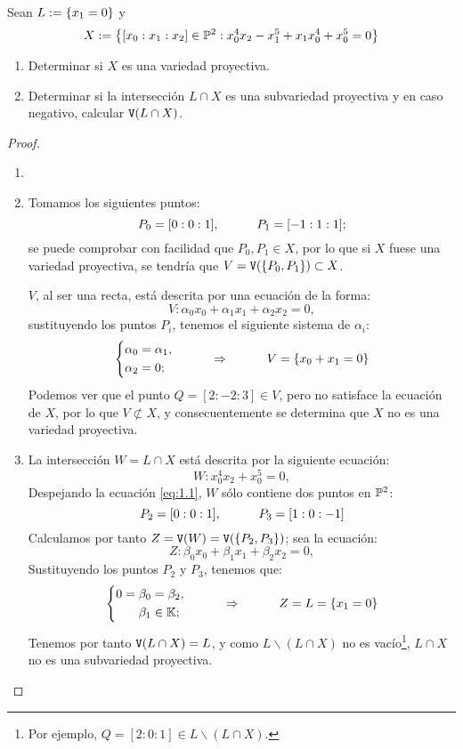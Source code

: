 \documentclass{homeworg}
\author{\hspace{\halte}\hspace{-4.02em}\normalsize Benaroya~Garzas, Isidro\\
\hspace{\halte}\normalsize Carpes~Martínez, Antonio~Alberto\\
\hspace{\halte}\hspace{-2.74em}\normalsize Muela~Cascallana, Juan~José\\
\hspace{\halte}\hspace{-5.35em}\normalsize Salamanca~Camacho, Jaime\\
\hspace{\halte}\hspace{1.68em}\normalsize Wu, Xiaoye}}
\begin{document}
\renewcommand{\proofname}{Solución}

\maketitle

\normalsize
\exercise
Sean $L:=\qty{x_{1}=0}$ y $$X:=\qty{\qty[x_{0}:x_{1}:x_{2}]\in\P^{2}:x_{0}^{4}x_{2}-x_{1}^{5}+x_{1}x_{0}^{4}+x_{0}^{5}=0}$$
\begin{enumerate}[label=\roman*)]
\item Determinar si $X$ es una variedad proyectiva.
\item Determinar si la intersección $L\cap X$ es una subvariedad proyectiva y en caso negativo, calcular $\V\qty(L\cap X)$.
\end{enumerate}

\begin{proof}
\begin{enumerate}[label=\roman*)]
\item[]
\item Tomamos los siguientes puntos:
$$P_{0}=\qty[0:0:1],\hmid P_{1}=\qty[-1:1:1];$$
se puede comprobar con facilidad que $P_{0},P_{1}\in X$, por lo que si $X$ fuese una variedad proyectiva, se tendría que $V=\V\qty(\qty{P_{0},P_{1}})\subset X$.

$V$, al ser una recta, está descrita por una ecuación de la forma:
$$V:\alpha_{0}x_{0}+\alpha_{1}x_{1}+\alpha_{2}x_{2}=0,$$sustituyendo los puntos $P_{i}$, tenemos el siguiente sistema de $\alpha_{i}$:
\begin{equation*}
\left\{
\begin{split}
\alpha_{0}&=\alpha_{1},\\
\alpha_{2}&=0;
\end{split}
\right.\hmidthen V=\qty{x_{0}+x_{1}=0}
\end{equation*}
Podemos ver que el punto $Q=[2:-2:3]\in V$, pero no satisface la ecuación de $X$, por lo que $V\not\subset X$, y consecuentemente se determina que $X$ no es una variedad proyectiva.

\item La intersección $W=L\cap X$ está descrita por la siguiente ecuación:
\begin{equation}\label{eq:1.1}
W:x_{0}^{4}x_{2}+x_{0}^{5}=0,
\end{equation}
Despejando la ecuación \eqref{eq:1.1}, $W$ sólo contiene dos puntos en $\P^{2}$:
$$P_{2}=[0:0:1],\hmid P_{3}=[1:0:-1]$$
Calculamos por tanto $Z=\V\qty(W)=\V\qty(\qty{P_{2},P_{3}})$; sea la ecuación:
$$Z:\beta_{0}x_{0}+\beta_{1}x_{1}+\beta_{2}x_{2}=0,$$
Sustituyendo los puntos $P_{2}$ y $P_{3}$, tenemos que:
$$\left\{
\begin{split}
0=\beta_{0}&=\beta_{2},\\
\beta_{1}&\in\K;
\end{split}
\right.\hmidthen Z=L=\qty{x_{1}=0}$$
Tenemos por tanto $\V\qty(L\cap X)=L$, y como $L\backslash (L\cap X)$ no es vacío\footnote{Por ejemplo, $Q=[2:0:1]\in L\backslash (L\cap X)$.}, $L\cap X$ no es una subvariedad proyectiva.

\end{enumerate}
\end{proof}
\end{document}
